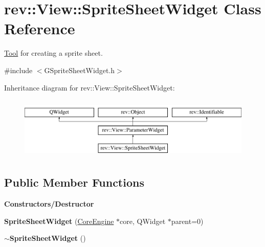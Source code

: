 \hypertarget{classrev_1_1_view_1_1_sprite_sheet_widget}{}\section{rev\+::View\+::Sprite\+Sheet\+Widget Class Reference}
\label{classrev_1_1_view_1_1_sprite_sheet_widget}


\mbox{\hyperlink{classrev_1_1_view_1_1_tool}{Tool}} for creating a sprite sheet.  




{\ttfamily \#include $<$G\+Sprite\+Sheet\+Widget.\+h$>$}

Inheritance diagram for rev\+::View\+::Sprite\+Sheet\+Widget\+:\begin{figure}[H]
\begin{center}
\leavevmode
\includegraphics[height=3.000000cm]{classrev_1_1_view_1_1_sprite_sheet_widget}
\end{center}
\end{figure}
\subsection*{Public Member Functions}
\begin{Indent}\textbf{ Constructors/\+Destructor}\par
\begin{DoxyCompactItemize}
\item 
\mbox{\label{classrev_1_1_view_1_1_sprite_sheet_widget_af8f9c2b27bb80c36ccbbb7f155b2da9b}} 
{\bfseries Sprite\+Sheet\+Widget} (\mbox{\hyperlink{classrev_1_1_core_engine}{Core\+Engine}} $\ast$core, Q\+Widget $\ast$parent=0)
\item 
\mbox{\label{classrev_1_1_view_1_1_sprite_sheet_widget_a4940debd3497a0d3f0fa9aef39004ee4}} 
{\bfseries $\sim$\+Sprite\+Sheet\+Widget} ()
\end{DoxyCompactItemize}
\end{Indent}
